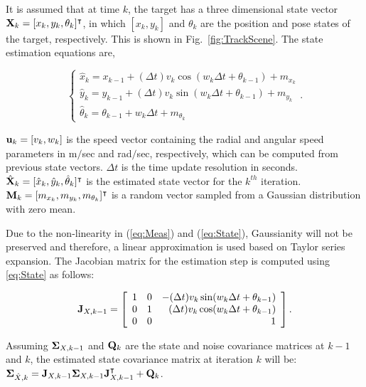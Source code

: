It is assumed that at time $k$, the target has a three dimensional state vector ${\bf X}_k = [x_k, y_k, \theta_k]^\intercal$, in which $[x_k, y_k]$ and $\theta_k$ are the position and pose states of the target, respectively. This is shown in Fig.~\ref{fig:TrackScene}. The state estimation equations are,

\begin{equation}
\left\{
\begin{array}{l}
\hat{x}_k = x_{k-1} + (\Delta t) v_k \cos(w_k \Delta t + \theta_{k-1}) + m_{x_k} \\
\hat{y}_k = y_{k-1} + (\Delta t) v_k \sin(w_k \Delta t + \theta_{k-1}) + m_{y_k} \\
\hat{\theta}_k = \theta_{k-1} + w_k \Delta t + m_{\theta_k}
\end{array}
\right..
\label{eq:State}
\end{equation}

\noindent ${\bf u}_k = [v_k, w_k]$ is the speed vector containing the radial and angular speed parameters in m$/$sec and rad$/$sec, respectively, which can be computed from previous state vectors. $\Delta t$ is the time update resolution in seconds. $\hat{{\bf X}}_k = [\hat{x}_k, \hat{y}_k, \hat{\theta}_k]^\intercal$ is the estimated state vector for the $k^{th}$ iteration. ${\bf M}_k = [m_{x_k}, m_{y_k}, m_{\theta_k}]^\intercal$ is a random vector sampled from a Gaussian distribution with zero mean. 

Due to the non-linearity in (\ref{eq:Meas}) and (\ref{eq:State}), Gaussianity will not be preserved and therefore, a linear approximation is used based on Taylor series expansion. 
The Jacobian matrix for the estimation step is computed using \ref{eq:State} as follows:

\begin{equation}
{\bf J}_{X, k-1} = \left[
\begin{array}{llr}
1 & 0 & -(\Delta t) v_k \sin(w_k \Delta t + \theta_{k-1}) \\
0 & 1 &  (\Delta t) v_k \cos(w_k \Delta t + \theta_{k-1}) \\
0 & 0 & 1 
\end{array}
 \right].
\end{equation}

\noindent Assuming ${\bf \Sigma}_{{X}, k-1}$ and ${\bf Q}_{k}$ are the state and noise covariance matrices at $k-1$ and $k$, the estimated state covariance matrix at iteration $k$ will be: ${\bf \Sigma}_{\hat{X}, k} = {\bf J}_{X, k-1}{\bf \Sigma}_{X, k-1}{\bf J}_{X, k-1}^\intercal + {\bf Q}_{k}$.

